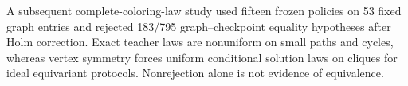 A subsequent complete-coloring-law study used fifteen frozen policies on 53 fixed graph entries and rejected 183/795 graph--checkpoint equality hypotheses after Holm correction. Exact teacher laws are nonuniform on small paths and cycles, whereas vertex symmetry forces uniform conditional solution laws on cliques for ideal equivariant protocols. Nonrejection alone is not evidence of equivalence.
